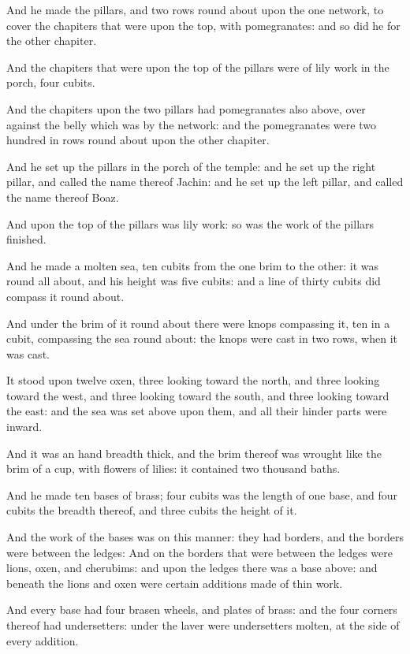 \Verse And he made the pillars, and two rows round about upon the one network, to cover the chapiters that were upon the top, with pomegranates: and so did he for the other chapiter.

\Verse And the chapiters that were upon the top of the pillars were of lily work in the porch, four cubits.

\Verse And the chapiters upon the two pillars had pomegranates also above, over against the belly which was by the network: and the pomegranates were two hundred in rows round about upon the other chapiter.

\Verse And he set up the pillars in the porch of the temple: and he set up the right pillar, and called the name thereof Jachin: and he set up the left pillar, and called the name thereof Boaz.

\Verse And upon the top of the pillars was lily work: so was the work of the pillars finished.

\Verse And he made a molten sea, ten cubits from the one brim to the other: it was round all about, and his height was five cubits: and a line of thirty cubits did compass it round about.

\Verse And under the brim of it round about there were knops compassing it, ten in a cubit, compassing the sea round about: the knops were cast in two rows, when it was cast.

\Verse It stood upon twelve oxen, three looking toward the north, and three looking toward the west, and three looking toward the south, and three looking toward the east: and the sea was set above upon them, and all their hinder parts were inward.

\Verse And it was an hand breadth thick, and the brim thereof was wrought like the brim of a cup, with flowers of lilies: it contained two thousand baths.

\Verse And he made ten bases of brass; four cubits was the length of one base, and four cubits the breadth thereof, and three cubits the height of it.

\Verse And the work of the bases was on this manner: they had borders, and the borders were between the ledges: \Verse And on the borders that were between the ledges were lions, oxen, and cherubims: and upon the ledges there was a base above: and beneath the lions and oxen were certain additions made of thin work.

\Verse And every base had four brasen wheels, and plates of brass: and the four corners thereof had undersetters: under the laver were undersetters molten, at the side of every addition.

